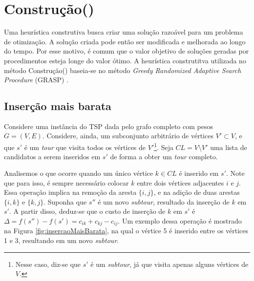 \section{Construção()}
Uma heurística construtiva busca criar uma solução razoável para um problema de otimização. A solução criada pode então ser modificada e melhorada ao longo do tempo. Por esse motivo, é comum que o valor objetivo de soluções geradas por procedimentos esteja longe do valor ótimo. A heurística construtitva  utilizada no método Construção() baseia-se no método \textit{Greedy Randomized Adaptive Search Procedure} (GRASP) . 

\subsection{Inserção mais barata}
Considere uma instância do TSP dada pelo grafo completo com pesos \(G = (V,E)\). Considere, ainda, um subconjunto arbitrário de vértices \(V' \subset V\), e que \(s'\) é um \textit{tour} que visita todos os vértices de \(V'\)\footnote{Nesse caso, diz-se que \(s'\) é um \textit{subtour}, já que visita apenas alguns vértices de \(V\).}. Seja \(CL = V \setminus V'\) uma lista de candidatos a serem inseridos em \(s'\) de forma a obter um \textit{tour} completo.

Analisemos o que ocorre quando um único vértice \(k \in CL\) é inserido em \(s'\). Note que para isso, é sempre necessário colocar \(k\) entre dois vértices adjacentes \(i\) e \(j\). Essa operação implica na remoção da aresta \(\{i,j\}\), e na adição de duas arestas \(\{i,k\}\) e \(\{k,j\}\). Suponha que \(s''\) é um novo \textit{subtour}, resultado da inserção de \(k\) em \(s'\). A partir disso, deduz-se que o custo de inserção de \(k\) em \(s'\) é \(\Delta = f(s'') - f(s') = c_{ik} + c_{kj} - c_{ij}\). Um exemplo dessa operação é mostrado na Figura \ref{fig:insercaoMaisBarata}, na qual o vértice 5 é inserido entre os vértices 1 e 3, resultando em um novo \textit{subtour}.


